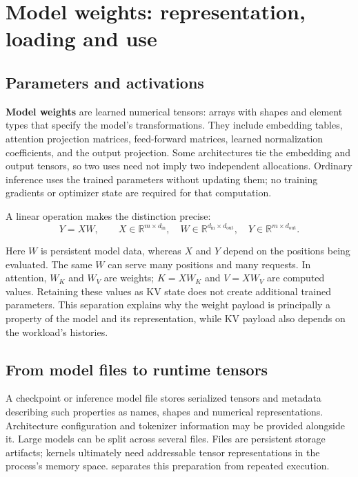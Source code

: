 \section{Model weights: representation, loading and use}
\label{sec:model-weights}

\subsection{Parameters and activations}

\textbf{Model weights} are learned numerical tensors: arrays with shapes
and element types that specify the model's transformations.  They
include embedding tables, attention projection matrices, feed-forward
matrices, learned normalization coefficients, and the output projection.
Some architectures tie the embedding and output tensors, so two uses need
not imply two independent allocations.  Ordinary inference uses the
trained parameters without updating them; no training gradients or
optimizer state are required for that computation.

A linear operation makes the distinction precise:
\begin{equation}
\label{eq:weights-activations}
 Y=XW,\qquad
 X\in\mathbb{R}^{m\times d_{\mathrm{in}}},\quad
 W\in\mathbb{R}^{d_{\mathrm{in}}\times d_{\mathrm{out}}},\quad
 Y\in\mathbb{R}^{m\times d_{\mathrm{out}}}.
\end{equation}

Here \(W\) is persistent model data, whereas \(X\) and \(Y\) depend on
the positions being evaluated.  The same \(W\) can serve many positions
and many requests.  In attention, \(W_K\) and \(W_V\) are weights;
\(K=XW_K\) and \(V=XW_V\) are computed values.  Retaining these values
as KV state does not create additional trained parameters.  This
separation explains why the weight payload is principally a property of
the model and its representation, while KV payload also depends on the
workload's histories.

\subsection{From model files to runtime tensors}

A checkpoint or inference model file stores serialized tensors and
metadata describing such properties as names, shapes and numerical
representations.  Architecture configuration and tokenizer information
may be provided alongside it.  Large models can be split across several
files.  Files are persistent storage artifacts; kernels ultimately need
addressable tensor representations in the process's memory space.
 separates this preparation from repeated
execution.

